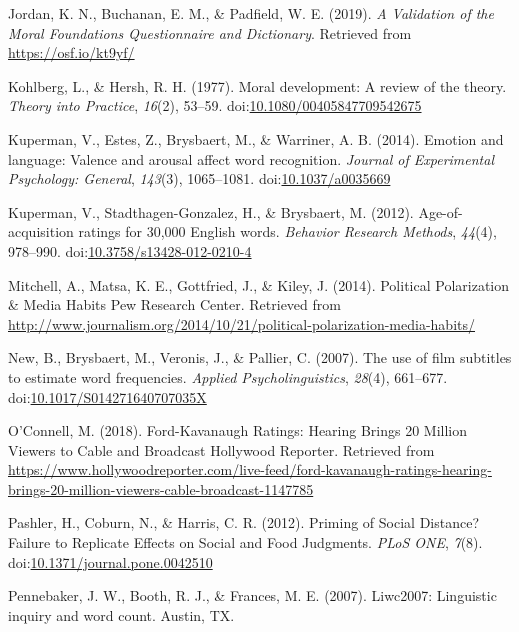 \documentclass[,man]{apa6}
\begin{document}
\hypertarget{ref-Jordan2019}{}
Jordan, K. N., Buchanan, E. M., \& Padfield, W. E. (2019). \emph{A
Validation of the Moral Foundations Questionnaire and Dictionary}.
Retrieved from \url{https://osf.io/kt9yf/}

\hypertarget{ref-Kohlberg1977}{}
Kohlberg, L., \& Hersh, R. H. (1977). Moral development: A review of the
theory. \emph{Theory into Practice}, \emph{16}(2), 53--59.
doi:\href{https://doi.org/10.1080/00405847709542675}{10.1080/00405847709542675}

\hypertarget{ref-Kuperman2014}{}
Kuperman, V., Estes, Z., Brysbaert, M., \& Warriner, A. B. (2014).
Emotion and language: Valence and arousal affect word recognition.
\emph{Journal of Experimental Psychology: General}, \emph{143}(3),
1065--1081.
doi:\href{https://doi.org/10.1037/a0035669}{10.1037/a0035669}

\hypertarget{ref-Kuperman2012}{}
Kuperman, V., Stadthagen-Gonzalez, H., \& Brysbaert, M. (2012).
Age-of-acquisition ratings for 30,000 English words. \emph{Behavior
Research Methods}, \emph{44}(4), 978--990.
doi:\href{https://doi.org/10.3758/s13428-012-0210-4}{10.3758/s13428-012-0210-4}

\hypertarget{ref-Mitchell2014}{}
Mitchell, A., Matsa, K. E., Gottfried, J., \& Kiley, J. (2014).
Political Polarization \& Media Habits \textbar{} Pew Research Center.
Retrieved from
\url{http://www.journalism.org/2014/10/21/political-polarization-media-habits/}

\hypertarget{ref-New2007}{}
New, B., Brysbaert, M., Veronis, J., \& Pallier, C. (2007). The use of
film subtitles to estimate word frequencies. \emph{Applied
Psycholinguistics}, \emph{28}(4), 661--677.
doi:\href{https://doi.org/10.1017/S014271640707035X}{10.1017/S014271640707035X}

\hypertarget{ref-OConnell2018}{}
O'Connell, M. (2018). Ford-Kavanaugh Ratings: Hearing Brings 20 Million
Viewers to Cable and Broadcast \textbar{} Hollywood Reporter. Retrieved
from
\url{https://www.hollywoodreporter.com/live-feed/ford-kavanaugh-ratings-hearing-brings-20-million-viewers-cable-broadcast-1147785}

\hypertarget{ref-Pashler2012}{}
Pashler, H., Coburn, N., \& Harris, C. R. (2012). Priming of Social
Distance? Failure to Replicate Effects on Social and Food Judgments.
\emph{PLoS ONE}, \emph{7}(8).
doi:\href{https://doi.org/10.1371/journal.pone.0042510}{10.1371/journal.pone.0042510}

\hypertarget{ref-Pennebaker2007}{}
Pennebaker, J. W., Booth, R. J., \& Frances, M. E. (2007). Liwc2007:
Linguistic inquiry and word count. Austin, TX.
\end{document}
